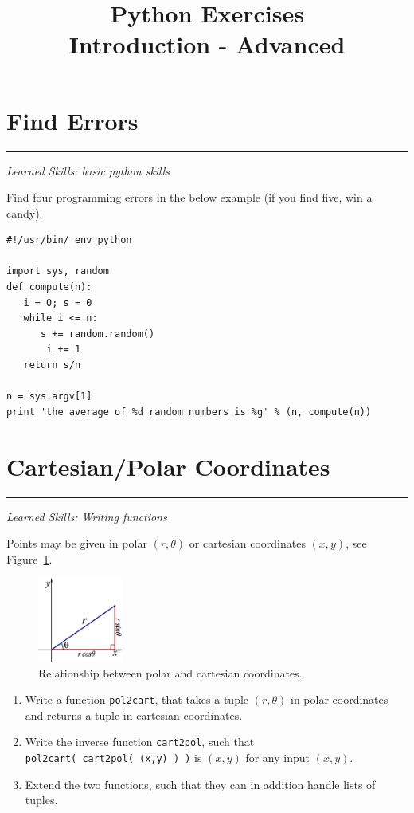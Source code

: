 \documentclass[smallheadings,12pt]{scrartcl}
\newcommand{\skills}[1]{\rule{1cm}{0pt}{\begin{minipage}{.8\textwidth}\small\em
      Learned Skills:  #1\end{minipage}}}
\begin{document}
\parindent0cm
\title{Python Exercises\\ Introduction - Advanced}
\lstset{language=Python,numbers=left,frame=shadowbox}
\date{}
\maketitle

\section{Find Errors}
\skills{basic python skills}

Find four programming errors in the below example (if you find five,
win a candy).
\begin{lstlisting}
#!/usr/bin/ env python

import sys, random
def compute(n):
   i = 0; s = 0
   while i <= n:
      s += random.random()
       i += 1
   return s/n

n = sys.argv[1]
print 'the average of %d random numbers is %g' % (n, compute(n))
\end{lstlisting}


\section{Cartesian/Polar Coordinates}
\skills{Writing functions}

Points may be given in polar $(r,\theta)$ or cartesian coordinates
$(x,y)$, see Figure~\ref{fig:pol2cart}.
\begin{figure}[H]
  \centering
  \includegraphics[width=0.25\textwidth]{pics/pol2cart}
  \caption{Relationship between polar and cartesian coordinates.\label{fig:pol2cart}}
\end{figure}

\begin{enumerate}
\item Write a function \texttt{pol2cart}, that takes a tuple $(r,\theta)$ in polar
  coordinates and returns a tuple in cartesian coordinates. 
\item Write the inverse function \texttt{cart2pol}, such that {\tt
  pol2cart(~cart2pol(~(x,y)~)~)} is $(x,y)$ for any input $(x,y)$.
\item Extend the two functions, such that they can in addition handle
  lists of tuples.
\end{enumerate}
\end{document}
